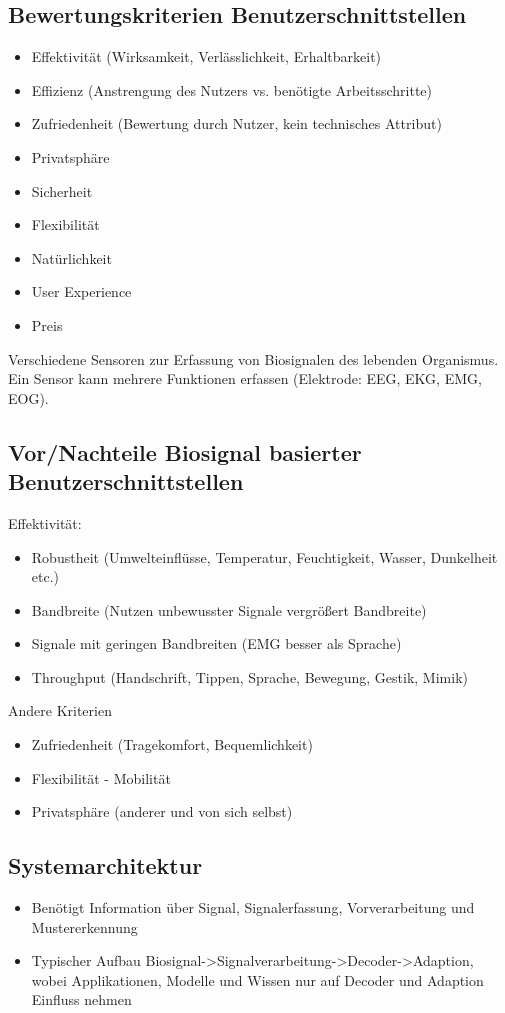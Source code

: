 \documentclass[a4paper,10pt,oneside]{article}
\begin{document}
\subsection{Bewertungskriterien Benutzerschnittstellen}
\begin{itemize}
	\item Effektivität (Wirksamkeit, Verlässlichkeit, Erhaltbarkeit)
	\item Effizienz (Anstrengung des Nutzers vs. benötigte Arbeitsschritte)
	\item Zufriedenheit (Bewertung durch Nutzer, kein technisches Attribut)
	\item Privatsphäre
	\item Sicherheit
	\item Flexibilität
	\item Natürlichkeit
	\item User Experience
	\item Preis
\end{itemize}

Verschiedene Sensoren zur Erfassung von Biosignalen des lebenden Organismus. \\
Ein Sensor kann mehrere Funktionen erfassen (Elektrode: EEG, EKG, EMG, EOG).

\subsection{Vor/Nachteile Biosignal basierter Benutzerschnittstellen}
Effektivität:
\begin{itemize}
	\item Robustheit (Umwelteinflüsse, Temperatur, Feuchtigkeit, Wasser, Dunkelheit etc.)
	\item Bandbreite (Nutzen unbewusster Signale vergrößert Bandbreite)
	\item Signale mit geringen Bandbreiten (EMG besser als Sprache)
	\item Throughput (Handschrift, Tippen, Sprache, Bewegung, Gestik, Mimik)
\end{itemize}
Andere Kriterien
\begin{itemize}
 \item Zufriedenheit (Tragekomfort, Bequemlichkeit)
 \item Flexibilität - Mobilität
 \item Privatsphäre (anderer und von sich selbst)
\end{itemize}

\subsection{Systemarchitektur}
\begin{itemize}
	\item Benötigt Information über Signal, Signalerfassung, Vorverarbeitung und Mustererkennung
	\item Typischer Aufbau Biosignal->Signalverarbeitung->Decoder->Adaption, wobei Applikationen, Modelle und Wissen nur auf Decoder und Adaption Einfluss nehmen
\end{itemize}
\end{document}
